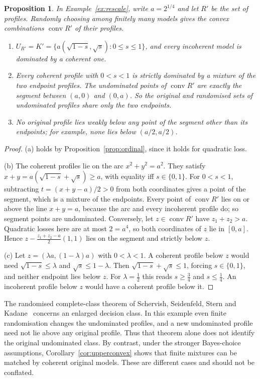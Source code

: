 \documentclass[11pt]{article}
\newtheorem{proposition}[theorem]{Proposition}
\theoremstyle{definition}
\theoremstyle{remark}
\newcommand{\co}{\operatorname{conv}}
\begin{document}
\label{sec:random}
\begin{proposition}\label{prop:random}
In Example~\ref{ex:rescale}, write $a=2^{1/4}$ and let $R'$ be the set of profiles. Randomly choosing among finitely many models gives the convex combinations $\co R'$ of their profiles.
\begin{enumerate}[label=(\alph*)]
\item $U_{R'}=K'=\{a(\sqrt{1-s},\sqrt s):0\le s\le1\}$, and every incoherent model is dominated by a coherent one.
\item Every coherent profile with $0<s<1$ is strictly dominated by a mixture of the two endpoint profiles. The undominated points of $\co R'$ are exactly the segment between $(a,0)$ and $(0,a)$. So the original and randomised sets of undominated profiles share only the two endpoints.
\item No original profile lies weakly below any point of the segment other than its endpoints; for example, none lies below $(a/2,a/2)$.
\end{enumerate}
\end{proposition}
\begin{proof}
(a) holds by Proposition~\ref{prop:ordinal}, since it holds for quadratic loss.

(b) The coherent profiles lie on the arc $x^2+y^2=a^2$. They satisfy $x+y=a(\sqrt{1-s}+\sqrt s)\ge a$, with equality iff $s\in\{0,1\}$. For $0<s<1$, subtracting $t=(x+y-a)/2>0$ from both coordinates gives a point of the segment, which is a mixture of the endpoints. Every point of $\co R'$ lies on or above the line $x+y=a$, because the arc and every incoherent profile do; so segment points are undominated. Conversely, let $z\in\co R'$ have $z_1+z_2>a$. Quadratic losses here are at most $2=a^4$, so both coordinates of $z$ lie in $[0,a]$. Hence $z-\tfrac{z_1+z_2-a}2(1,1)$ lies on the segment and strictly below $z$.

(c) Let $z=(\lambda a,(1-\lambda)a)$ with $0<\lambda<1$. A coherent profile below $z$ would need $\sqrt{1-s}\le\lambda$ and $\sqrt s\le1-\lambda$. Then $\sqrt{1-s}+\sqrt s\le1$, forcing $s\in\{0,1\}$, and neither endpoint lies below $z$. For $\lambda=\tfrac12$ this reads $s\ge\tfrac34$ and $s\le\tfrac14$. An incoherent profile below $z$ would have a coherent profile below it.
\end{proof}

The randomised complete-class theorem of Schervish, Seidenfeld, Stern and Kadane~\cite[Theorem~1]{SSSK} concerns an enlarged decision class. In this example even finite randomisation changes the undominated profiles, and a new undominated profile need not lie above any original profile. Thus that theorem alone does not identify the original undominated class. By contrast, under the stronger Bayes-choice assumptions, Corollary~\ref{cor:upperconvex} shows that finite mixtures can be matched by coherent original models. These are different cases and should not be conflated.
\end{document}
